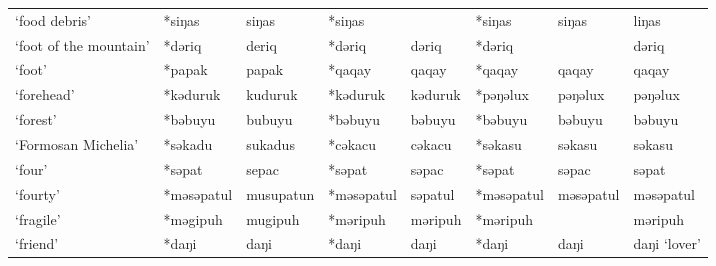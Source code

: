 \begin{landscape}
\begin{longtable}[c]{@{}p{3cm}<{\raggedright}p{2.75cm}<{\raggedright}p{2.75cm}<{\raggedright}p{2.75cm}<{\raggedright}p{2.75cm}<{\raggedright}p{2.75cm}<{\raggedright}p{2.75cm}<{\raggedright}p{2.75cm}<{\raggedright}@{}}
`food debris'                                        & *siŋas       & siŋas                         & *siŋas         &                            & *siŋas           & siŋas                    & liŋas                             \\
`foot of the mountain'                               & *dəriq       & deriq                         & *dəriq         & dəriq                      & *dəriq           &                          & dəriq                             \\
`foot'                                               & *papak       & papak                         & *qaqay         & qaqay                      & *qaqay           & qaqay                    & qaqay                             \\
`forehead'                                           & *kəduruk     & kuduruk                       & *kəduruk       & kəduruk                    & *pəŋəlux         & pəŋəlux                  & pəŋəlux                           \\
`forest'                                             & *bəbuyu      & bubuyu                        & *bəbuyu        & bəbuyu                     & *bəbuyu          & bəbuyu                   & bəbuyu                            \\
`Formosan Michelia'                                  & *səkadu      & sukadus                       & *cəkacu        & cəkacu                     & *səkasu          & səkasu                   & səkasu                            \\
`four'                                               & *səpat       & sepac                         & *səpat         & səpac                      & *səpat           & səpac                    & səpat                             \\
`fourty'                                             & *məsəpatul   & musupatun                     & *məsəpatul     & səpatul                    & *məsəpatul       & məsəpatul                & məsəpatul                         \\
`fragile'                                            & *məgipuh     & mugipuh                       & *məripuh       & məripuh                    & *məripuh         &                          & məripuh                           \\
`friend'                                             & *daŋi        & daŋi                          & *daŋi          & daŋi                       & *daŋi            & daŋi                     & daŋi `lover'                      \\

\end{longtable}
\end{landscape}
